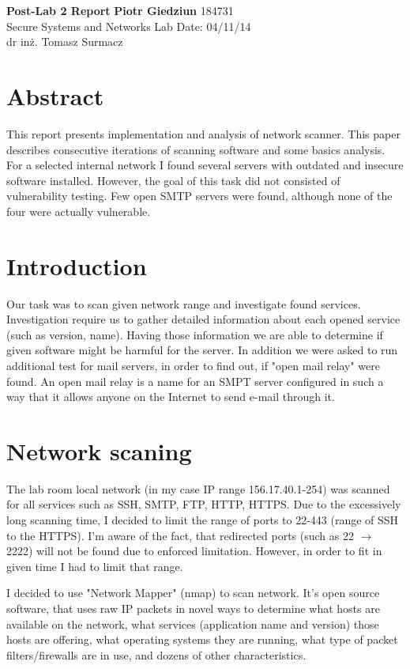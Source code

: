 \documentclass[a4paper, 11pt]{article}
\begin{document}
\noindent
\large\textbf{Post-Lab 2 Report} \hfill \textbf{Piotr Giedziun} 184731\\
\normalsize Secure Systems and Networks \hfill  Lab Date: 04/11/14 \\
dr inż. Tomasz Surmacz

\section*{Abstract}
This report presents implementation and analysis of network scanner. This paper describes consecutive iterations of scanning software and some basics analysis.
For a selected internal network I found several servers with outdated and insecure software installed. However, the goal of this task did not consisted of vulnerability testing. Few open SMTP servers were found, although none of the four were actually vulnerable.

\section*{Introduction}
Our task was to scan given network range and investigate found services. Investigation require us to gather detailed information about each opened service (such as version, name). Having those information we are able to determine if given software might be harmful for the server. 
In addition we were asked to run additional test for mail servers, in order to find out, if "open mail relay" were found.
An open mail relay is a name for an SMPT server configured in such a way that it allows anyone on the Internet to send e-mail through it.

\section*{Network scaning}

The lab room local network (in my case IP range 156.17.40.1-254) was scanned for all services such as SSH, SMTP, FTP, HTTP, HTTPS.
Due to the excessively long scanning time, I decided to limit the range of ports to 22-443 (range of SSH to the HTTPS).
I'm aware of the fact, that redirected ports (such as 22 $\rightarrow$ 2222) will not be found due to enforced limitation. However, in order to fit in given time I had to limit that range.

I decided to use "Network Mapper" (nmap) to scan network. It's open source software, that uses raw IP packets in novel ways to determine what hosts are available on the network, what services (application name and version) those hosts are offering, what operating systems they are running, what type of packet filters/firewalls are in use, and dozens of other characteristics.
\end{document}
